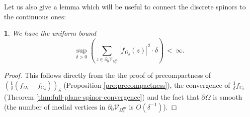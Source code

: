 \documentclass[oneside,english]{amsart}
\numberwithin{equation}{section}
\numberwithin{figure}{section}
\theoremstyle{plain}
\theoremstyle{plain}
\theoremstyle{plain}
\theoremstyle{plain}
\theoremstyle{plain}
\newtheorem{lem}[thm]{\protect\lemmaname}
\theoremstyle{definition}
\theoremstyle{remark}
\providecommand{\lemmaname}{Lemma}
\begin{document}
Let us also give a lemma which will be useful to connect the discrete
spinors to the continuous ones:
\begin{lem}
\textup{\label{lem:boundedness-bdry-integral-square}We have the uniform
bound 
\[
\sup_{\delta>0}\left(\sum_{z\in\partial_{0}\mathcal{V}_{\Omega_{\delta}^{m}}}\left|f_{\Omega_{\delta}}\left(z\right)\right|^{2}\cdot\delta\right)\,<\,\infty.
\]
}\end{lem}
\begin{proof}
This follows directly from the the proof of precompactness of $\left(\frac{1}{\delta}\left(f_{\Omega_{\delta}}-f_{\mathbb{C}_{\delta}}\right)\right)_{\delta}$
(Proposition \ref{pro:precompactness}), the convergence of $\frac{1}{\delta}f_{\mathbb{C}_{\delta}}$
(Theorem \ref{thm:full-plane-spinor-convergence}) and the fact that
$\partial\Omega$ is smooth (the number of medial vertices in $\partial_{0}\mathcal{V}_{\Omega_{\delta}^{m}}$
is $O\left(\delta^{-1}\right)$).
\end{proof}
\end{document}
